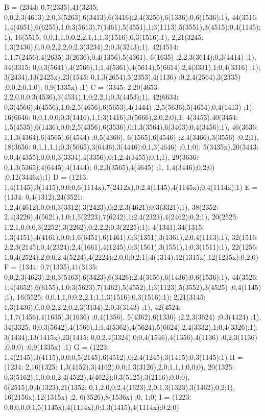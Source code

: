 B = (2344: 0,7(2335),41(3235: 0,0,2,3(4613),2;0,3(5263),6(3413),6(3416);2,4(3256),6(1336);0,6(1536);1), 
    44(3516: 1,4(4651),6(6255),1,0;3(5613),7(1461),5(4551),1;3(1113),5(3551),3(4515);0,4(1145);1), 
    16(5515: 0,0,1,1,0;0,2,2,1;1,1,3(1516);0,3(1516);1);
    2,21(3245: 1,3(2436),0,0,0;2,2,2,0;2,3(3234),2;0,3(3243);1), 
    42(4514: 1,1,7(2456),4(2635),3(2636);0,4(1356),5(4361), 6(1635) ;2,2,3(3614);0,3(4414) ;1), 
    34(3315: 0,0,3(5641),4(2566),1;1,4(5361),4(5614),5(6614);2,4(3331),1;0,4(3316) ;1); 
    3(2434),13(2425x),23(1545: 0,1,3(2654),3(2353),4(1136) ;0,2,4(2564),3(2335) ;0,0,2;0,1;0); 
    0,9(1335x) ;1) 
C = (3345: 2,20(4653: 2,2,0,0,0;3(4536),3(4534),1,0;2,2,1;0,3(4453);1), 
    42(6634: 0,3(4566),4(4556),1,0;2,5(4656),6(5653),4(1444) ;2,5(5636),5(4654);0,4(1413) ;1), 
    16(6646: 0,0,1,0,0;0,3(1416),1,1;3(1416),3(5666),2;0,2;0),1; 
    4(3453),40(3454: 1,5(4535),6(1436),0,0;2,5(4356),6(3536),0;1,3(3564),6(3463);0,4(3456);1), 
    46(3636: 1,1,3(4364),6(4565),6(4544) ;0,5(4366), 6(1565),6(4546) ;2,4(3466),3(3556) ;0,2;1), 
    18(3656: 0,1,1,1,1;0,3(5665),3(6446),3(4446);0,1,3(4646) ;0,1;0); 
    5(3435x),20(3443: 0,0,4(4355),0,0;0,3(3334),4(3356),0;1,2,4(3455);0,1;1), 
    29(3636: 0,1,3(5365),4(6445),4(1444); 0,2,3(3565),4(4645) ;1, 1,4(3446);0,2;0) ;0,12(3446x);1) 
D = (1213: 1,4(1145),3(1415),0,0;0,6(1114x),7(2412x),0;2,4(1145),4(1145x);0,4(1114x);1)
E = (1134: 0,4(1312),24(3521: 1,2,4(4612),0,0;0,3(3312),3(2423),0;2,2,3(4621);0,3(3321);1), 
    38(2352: 2,4(3226),4(5621),1,0;1,5(2223),7(6242),1;2,4(2323),4(2462);0,2;1), 
    20(2525: 1,2,1,0,0;0,3(2252),3(2262),0;2,2,2;0,3(2225);1); 
    4(1341),34(1315: 1,3(4151),4(4161),0,0;1,6(6451),6(1461),0;3(1351),3(1361),2;0,4(1113);1), 
    32(1516: 2,2,3(2145),0,4(2324);2,4(1661),4(1245),0;3(1561),3(1551),1;0,3(1511);1), 
    22(1256: 1,0,4(2524),2,0;0,2,4(5224),4(2224);2,0,0;0,2;1);4(1314),12(1315x),12(1235x);0,2;0)
F = (1344: 0,7(1335),41(3135: 0,0,2,3(4623),2;0,3(5163),6(3423),6(3426);2,4(3156),6(1436);0,6(1536);1),
    44(3526: 1,4(4652),6(6155),1,0;3(5623),7(1462),5(4552),1;3(1123),5(3552),3(4525) ;0,4(1145) ;1), 
    16(5525: 0,0,1,1,0;0,2,2,1;1,1,3(1516);0,3(1516);1); 
    2,21(3145: 1,3(1436),0,0,0;2,2,2,0;2,3(3134),2;0,3(3143) ;1), 
    42(4524: 1,1,7(1456),4(1635),3(1636) ;0,4(1356), 5(4362),6(1336) ;2,2,3(3624) ;0,3(4424) ;1), 
    34(3325: 0,0,3(5642),4(1566),1;1,4(5362),4(5624),5(6624);2,4(3332),1;0,4(3326);1); 
    3(1434),13(1415x),23(1415: 0,0,2,4(3324),0;0,4(1546),4(1356),4(1136) ;0,2,3(1136) ;0,0;0) ;0,9(1335x) ;1) 
G = (1223: 1,4(2145),3(4115),0,0;0,5(2145),6(4512),0;2,4(1245),3(1415);0,3(1145);1) 
H = (1234: 2,16(1325: 1,3(4152),3(4162),0,0;1,3(3126),2,0;1,1,1;0,0;0), 
    20(1325: 0,3(5162),1,0,0;0,2,4(4522),4(4622);0,3(5125),3(2116);0,0;0), 
    6(2515),0;4(1323),21(1352: 0,1,2,0,0;2,4(1623),2,0;1,3(1323),3(1462);0,2;1), 
    16(2156x),12(1315x) ;2, 6(3526),8(1536x) ;0, 1;0) 
I = (1223: 0,0,0,0,0;1,5(1145x),4(1114x),0;1,3(1415),4(1114x);0,2;0) 

